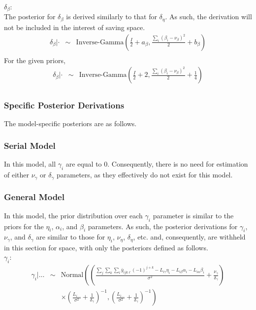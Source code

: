$\delta_{\beta}$:\\
The posterior for $\delta_{\beta}$ is derived similarly to that for
$\delta_{\eta}$.  As such, the derivation will not be included in the
interest of saving space.
\begin{eqnarray*}
\delta_{\beta}|\cdot&\sim&\mbox{Inverse-Gamma}\left(\frac{I}{2}+a_{\beta},\frac{\sum_i(\beta_i-\nu_{\beta})^2}{2}+b_{\beta}\right)\\
\end{eqnarray*}
For the given priors,
\begin{eqnarray*}
\delta_{\beta}|\cdot&\sim&\mbox{Inverse-Gamma}\left(\frac{I}{2}+2,\frac{\sum_i(\beta_i-\nu_{\beta})^2}{2}+\frac{1}{4}\right)\\
\end{eqnarray*}


\subsubsection{Specific Posterior Derivations}

The model-specific posteriors are as follows.\\

\subsubsection{Serial Model} 

In this model, all $\gamma_i$ are equal to 0. Consequently, there is
no need for estimation of either $\nu_{\gamma}$ or $\delta_{\gamma}$
parameters, as they effectively do not exist for this model.\\


\subsubsection{General Model}

In this model, the prior distribution over each $\gamma_i$ parameter
is similar to the priors for the $\eta_i$, $\alpha_i$, and $\beta_i$
parameters.  As such, the posterior derivations for $\gamma_i$,
$\nu_{\gamma}$, and $\delta_{\gamma}$ are similar to those for
$\eta_i$, $\nu_{\eta}$, $\delta_{\eta}$, etc. and, consequently, are
withheld in this section for space, with only the posteriors defined
as follows.\\

$\gamma_i$:\\
\begin{eqnarray*}
\gamma_i|\dots&\sim&\mbox{Normal}\left(\left(\frac{\sum_j\sum_k\sum_l\bar{y}_{ijk\ell}(-1)^{j+k}-L_{i\gamma}\eta_i-L_{i\beta}\alpha_i-L_{i\alpha}\beta_i}{\sigma^2}+\frac{\nu_{\gamma}}{\delta_{\gamma}}\right)\right.\\
&&\left.\times\left(\frac{L_{i\cdot\cdot}}{\sigma^2}+\frac{1}{\delta_{\gamma}}\right)^{-1},\left(\frac{L_{i\cdot\cdot}}{\sigma^2}+\frac{1}{\delta_{\gamma}}\right)^{-1}\right)\\
\end{eqnarray*}

